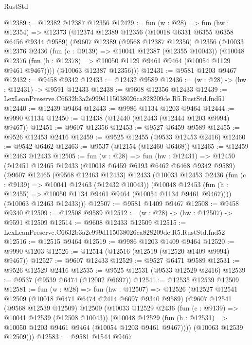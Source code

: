 \begin{lexlean}{RustStd}
\begin{coremodule}
@12389 := @12382 @12387 @12356
@12429 := fun (w : @28) =>
  fun (hw : @12354) =>
  @12373
    (@12374
      @12389
      @12356
      (@10018 @6331 @6355 @6358 @6456 @9344 @9589)
      (@9607
        @12389
        (@9568 @12387 @12356)
        @12356
        (@10033
          @12376
          @2436
          (fun (c : @9139) => @10041 @12387 (@12355 @10043))
          (@10048 @12376 (fun (h : @12378) => @10050 @1129 @9461 @9464 (@10054 @1129 @9461 @9467))))
        (@10063 @12387 @12356)))
@12431 := @9581 @1203 @9467
@12432 := @9458 @9342
@12433 := @12432 @9589
@12436 := (w : @28) -> (hw : @12431) -> @9591 @12433
@12438 := @9608 @12356 @12433
@12439 := LexLeanPreserve.C6632b3a2e999d115038026ca828209de.R5.RustStd.fnd51
@12440 := @12439 @9464
@12443 := @9986 @1134 @1203 @9464
@12444 := @9990 @1134
@12450 := @12438 (@12440 (@12443 (@12444 @1203 @9994) @9467))
@12451 := @9607 @12356
@12453 := @9527 @6459 @9589
@12455 := @9526 @12453 @2416
@12459 := @9525 @12455 (@9533 @12453 @2416)
@12460 := @9542 @6462
@12463 := @9537 (@12154 (@12460 @6468))
@12465 := @12459 @12463 @12433
@12505 := fun (w : @28) =>
  fun (hw : @12431) =>
  @12450
    (@12451
      @12465
      @12433
      (@10018 @6459 @6193 @6462 @6468 @9342 @9589)
      (@9607
        @12465
        (@9568 @12463 @12433)
        @12433
        (@10033
          @12453
          @2436
          (fun (c : @9139) => @10041 @12463 (@12432 @10043))
          (@10048 @12453 (fun (h : @12455) => @10050 @1134 @9461 @9464 (@10054 @1134 @9461 @9467))))
        (@10063 @12463 @12433)))
@12507 := @9581 @1409 @9467
@12508 := @9458 @9340
@12509 := @12508 @9589
@12512 := (w : @28) -> (hw : @12507) -> @9591 @12509
@12514 := @9608 @12433 @12509
@12515 := LexLeanPreserve.C6632b3a2e999d115038026ca828209de.R5.RustStd.fnd52
@12516 := @12515 @9464
@12519 := @9986 @1203 @1409 @9464
@12520 := @9990 @1203
@12526 := @12514 (@12516 (@12519 (@12520 @1409 @9994) @9467))
@12527 := @9607 @12433
@12529 := @9527 @6471 @9589
@12531 := @9526 @12529 @2416
@12535 := @9525 @12531 (@9533 @12529 @2416)
@12539 := @9537 (@9539 @6474 (@12002 @6697))
@12541 := @12535 @12539 @12509
@12581 := fun (w : @28) =>
  fun (hw : @12507) =>
  @12526
    (@12527
      @12541
      @12509
      (@10018 @6471 @6474 @2414 @6697 @9340 @9589)
      (@9607
        @12541
        (@9568 @12539 @12509)
        @12509
        (@10033
          @12529
          @2436
          (fun (c : @9139) => @10041 @12539 (@12508 @10043))
          (@10048 @12529 (fun (h : @12531) => @10050 @1203 @9461 @9464 (@10054 @1203 @9461 @9467))))
        (@10063 @12539 @12509)))
@12583 := @9581 @1544 @9467

\end{coremodule}
\end{lexlean}
